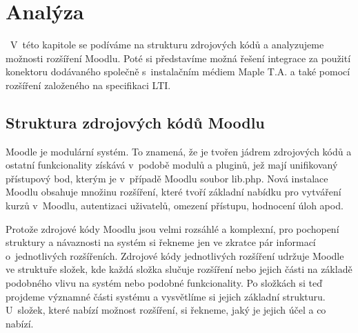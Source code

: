 \documentclass[
print,
  11pt,
  table,   
  nolof,    
  nolot,
  oneside,
  draft
]{fithesis3}
\begin{document}
\chapter{Analýza}\
V~této kapitole se podíváme na strukturu zdrojových kódů a analyzujeme možnosti rozšíření Moodlu. Poté si představíme možná řešení integrace za použití konektoru dodávaného společně s~instalačním médiem Maple T.A. a také pomocí rozšíření založeného na specifikaci LTI.
	\section{Struktura zdrojových kódů Moodlu}
Moodle je modulární systém. To znamená, že je tvořen jádrem zdrojových kódů a ostatní funkcionality získává v~podobě modulů a pluginů, jež mají unifikovaný přístupový bod, kterým je v~případě Moodlu soubor lib.php. Nová instalace Moodlu obsahuje množinu rozšíření, které tvoří základní nabídku pro vytváření kurzů v~Moodlu, autentizaci uživatelů, omezení přístupu, hodnocení úloh apod.

Protože zdrojové kódy Moodlu jsou velmi rozsáhlé a komplexní, pro pochopení struktury a návaznosti na systém si řekneme jen ve zkratce pár informací o~jednotlivých rozšířeních. Zdrojové kódy jednotlivých rozšíření udržuje Moodle ve struktuře složek, kde každá složka slučuje rozšíření nebo jejich části na základě podobného vlivu na systém nebo podobné funkcionality. Po složkách si teď projdeme významné části systému a vysvětlíme si jejich základní strukturu. U~složek, které nabízí možnost rozšíření, si řekneme, jaký je jejich účel a co nabízí.
\end{document}
